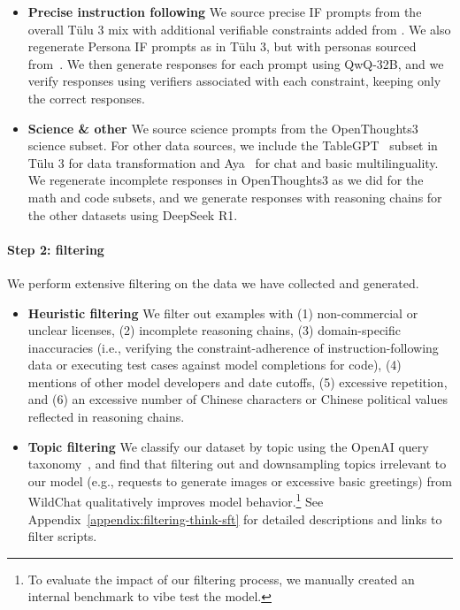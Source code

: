 \documentclass[table]{ai2style/ai2}
\begin{document}
\begin{itemize}
\item {\bf Precise instruction following}
We source precise IF prompts from the overall T\"ulu 3 mix with additional verifiable constraints added from \citet{pyatkin2025generalizing}.
We also regenerate Persona IF prompts as in T\"ulu 3, but with personas sourced from~\citet{nvidia/Nemotron-Personas-USA}.
We then generate responses for each prompt using QwQ-32B, and we verify responses using verifiers associated with each constraint, keeping only the correct responses.

\item {\bf Science \& other}
We source science prompts from the OpenThoughts3 science subset.
For other data sources, we include the TableGPT~\citep{zha2023tablegpt} subset in T\"ulu 3 for data transformation and Aya~\citep{singh2024aya} for chat and basic multilinguality.
We regenerate incomplete responses in OpenThoughts3 as we did for the math and code subsets, and we generate responses with reasoning chains for the other datasets using DeepSeek R1.

\end{itemize}

\paragraph{Step 2: filtering}
\label{sec:topic_filtering}
We perform extensive filtering on the data we have collected and generated.
\begin{itemize}
\item {\bf Heuristic filtering} We filter out examples with (1) non-commercial or unclear licenses, (2) incomplete reasoning chains, (3) domain-specific inaccuracies (i.e., verifying the constraint-adherence of instruction-following data or executing test cases against model completions for code), (4) mentions of other model developers and date cutoffs, (5) excessive repetition, and (6) an excessive number of Chinese characters or Chinese political values reflected in reasoning chains.
\item {\bf Topic filtering}  We classify our dataset by topic using the OpenAI query taxonomy~\citep{Chatterji2025-fs}, and find that filtering out and downsampling topics irrelevant to our model (e.g., requests to generate images or excessive basic greetings) from WildChat qualitatively improves model behavior.\footnote{To evaluate the impact of our filtering process, we manually created an internal benchmark to vibe test the model.} 
See Appendix~\ref{appendix:filtering-think-sft} for detailed descriptions and links to filter scripts.
\end{itemize}
\end{document}
